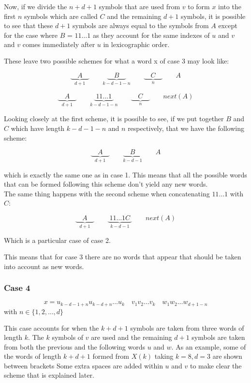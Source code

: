 \documentclass[11pt,a4paper]{tesis}
\theoremstyle{definition}
\begin{document}
Now, if we divide the $n + d + 1$ symbols that are used from $v$ to form $x$ into the first $n$ symbols which are called $C$ and the remaining $d + 1$ symbols, it is possible to see that these $d + 1$ symbols are always equal to the symbols from $A$ except for the case where $B$ = $11\dots1$ as they account for the same indexes of $u$ and $v$ and $v$ comes immediately after $u$ in lexicographic order. 


These leave two possible schemes for what a word x of case 3 may look like:

$$\underbrace{\quad A \quad }_{d +1} \qquad \underbrace{\quad B \quad }_{k - d - 1 - n}  \qquad \underbrace{\quad C \quad }_{n} \qquad A$$

$$\underbrace{\quad A \quad }_{d +1} \qquad \underbrace{\; 11\dots1 \; }_{k - d - 1 - n}  \qquad \underbrace{\quad C \quad }_{n} \qquad next(A)$$

Looking closely at the first scheme, it is possible to see, if we put together $B$ and $C$ which have length $k - d - 1 - n$ and $n$ respectively, that we have the following scheme:

$$\underbrace{\quad A \quad }_{d +1} \qquad \underbrace{\quad B \quad }_{k - d - 1}  \qquad A$$

which is exactly the same one as in case 1. This means that all the possible words that can be formed following this scheme don't yield any new words.
\\
The same thing happens with the second scheme when concatenating $11\dots1$ with $C$:

$$\underbrace{\quad A \quad }_{d +1} \qquad \underbrace{\; 11\dots1C \; }_{k - d - 1}  \qquad next(A)$$

Which is a particular case of case 2.

This means that for case 3 there are no words that appear that should be taken into account as new words.


\subsubsection{Case 4}
$$ x = u_{k-d-1+n} u_{k-d+n} \dots u_k \quad v_1 v_2 \dots v_k \quad w_1 w_2 \dots w_{d+1-n}$$
with $n \in \{1, 2, \dots , d\}$

This case accounts for when the $k + d + 1$ symbols are taken from three words of length $k$. The $k$ symbols of $v$ are used and the remaining $d + 1$ symbols are taken from both the previous and the following words $u$ and $w$.
As an example, some of the words of length $k + d + 1$ formed from $X(k)$ taking $k = 8, d = 3$ are shown between brackets
Some extra spaces are added within $u$ and $v$ to make clear the scheme that is explained later.
\end{document}
